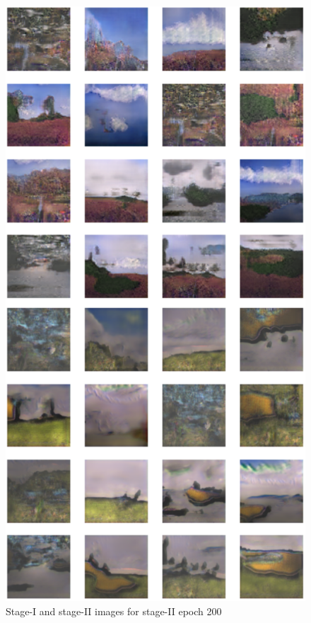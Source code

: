 \documentclass{article}
\begin{document}
	\begin{figure}[h]
	\centering
	\includegraphics[scale=0.6]{images/epoch200_FID403.png}
	\caption{Stage-I and stage-II images for stage-II epoch 200}
	\end{figure}
\end{document}
